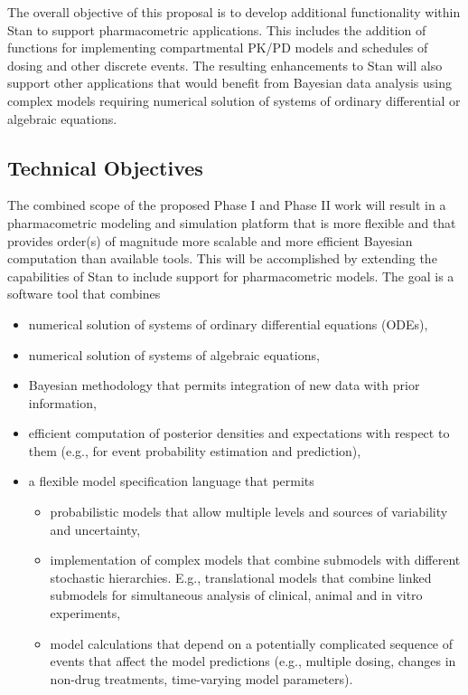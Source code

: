 \documentclass[11pt]{article}
\begin{document}
The overall objective of this proposal is to develop additional
functionality within Stan to support pharmacometric applications. This
includes the addition of functions for implementing compartmental PK/PD
models and schedules of dosing and other discrete events. The
resulting enhancements to Stan will also support other applications
that would benefit from Bayesian data analysis using complex models
requiring numerical solution of systems of ordinary differential or
algebraic equations.

\subsection*{Technical Objectives}

The combined scope of the proposed Phase I and Phase II work will
result in a pharmacometric modeling and simulation platform that is
more flexible and that provides order(s) of magnitude more scalable
and more efficient Bayesian computation than available tools. This
will be accomplished by extending the capabilities of Stan to include
support for pharmacometric models. The goal is a software tool that
combines 

\begin{itemize}
\item numerical solution of systems of ordinary differential equations
  (ODEs),
\item numerical solution of systems of algebraic equations,
\item Bayesian methodology that permits integration of new data with
  prior information,
\item efficient computation of posterior densities and expectations
  with respect to them (e.g., for event probability estimation and
  prediction),
\item a flexible model specification language that permits
\begin{itemize}
\item probabilistic models that allow multiple levels and sources of
  variability and uncertainty,
\item implementation of complex models that combine submodels with
  different stochastic hierarchies. E.g., translational models that
  combine linked submodels for simultaneous analysis of clinical,
  animal and in vitro experiments,
\item model calculations that depend on a
  potentially complicated sequence of events that affect the model
  predictions (e.g., multiple dosing, changes in non-drug treatments,
  time-varying model parameters).
\end{itemize}
\end{itemize}
\end{document}
